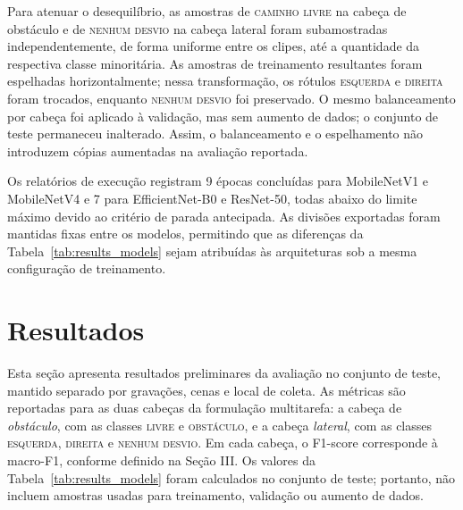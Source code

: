 \documentclass[conference]{IEEEtran}
\begin{document}
Para atenuar o desequilíbrio, as amostras de \textsc{caminho livre} na cabeça
de obstáculo e de \textsc{nenhum desvio} na cabeça lateral foram
subamostradas independentemente, de forma uniforme entre os clipes, até a
quantidade da respectiva classe minoritária. As amostras de treinamento
resultantes foram espelhadas horizontalmente; nessa transformação, os rótulos
\textsc{esquerda} e \textsc{direita} foram trocados, enquanto
\textsc{nenhum desvio} foi preservado. O mesmo balanceamento por cabeça foi
aplicado à validação, mas sem aumento de dados; o conjunto de teste permaneceu
inalterado. Assim, o balanceamento e o espelhamento não introduzem cópias
aumentadas na avaliação reportada.

Os relatórios de execução registram 9 épocas concluídas para MobileNetV1 e
MobileNetV4 e 7 para EfficientNet-B0 e ResNet-50, todas abaixo do limite
máximo devido ao critério de parada antecipada. As divisões exportadas foram
mantidas fixas entre os modelos, permitindo que as diferenças da
Tabela~\ref{tab:results_models} sejam atribuídas às arquiteturas sob a mesma
configuração de treinamento.

\section{Resultados}

Esta seção apresenta resultados preliminares da avaliação no conjunto de
teste, mantido separado por gravações, cenas e local de coleta. As métricas
são reportadas para as duas cabeças da formulação multitarefa: a cabeça de
\emph{obstáculo}, com as classes \textsc{livre} e \textsc{obstáculo}, e a
cabeça \emph{lateral}, com as classes \textsc{esquerda}, \textsc{direita} e
\textsc{nenhum desvio}. Em cada cabeça, o F1-score corresponde à macro-F1,
conforme definido na Seção III. Os valores da Tabela~\ref{tab:results_models}
foram calculados no conjunto de teste; portanto, não incluem amostras usadas
para treinamento, validação ou aumento de dados.
\end{document}
